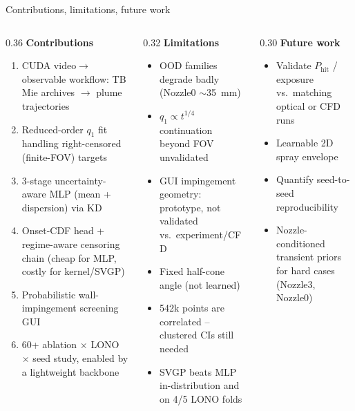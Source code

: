 \documentclass[aspectratio=169,11pt]{beamer}
\newcommand{\warn}[1]{\textcolor{warnRed}{#1}}
\begin{document}
\begin{frame}{Contributions, limitations, future work}
\footnotesize
\begin{columns}[T]
\begin{column}{0.36\linewidth}
\textbf{Contributions}
\begin{enumerate}\footnotesize
  \item CUDA video$\to$observable workflow: TB Mie archives $\to$ plume trajectories
  \item Reduced-order $q_1$ fit handling right-censored (finite-FOV) targets
  \item 3-stage uncertainty-aware MLP (mean + dispersion) via KD
  \item Onset-CDF head + regime-aware censoring chain (cheap for MLP, costly for kernel/SVGP)
  \item Probabilistic wall-impingement screening GUI
  \item 60+ ablation $\times$ LONO $\times$ seed study, enabled by a lightweight backbone
\end{enumerate}
\end{column}
\begin{column}{0.32\linewidth}
\textbf{\warn{Limitations}}
\begin{itemize}\footnotesize
  \item \warn{OOD families degrade badly} (Nozzle0 $\sim$\SI{35}{mm})
  \item $q_1\propto t^{1/4}$ continuation beyond FOV unvalidated
  \item GUI impingement geometry: prototype, not validated vs.\ experiment/CFD
  \item Fixed half-cone angle (not learned)
  \item 542k points are correlated -- clustered CIs still needed
  \item SVGP beats MLP in-distribution and on 4/5 LONO folds
\end{itemize}
\end{column}
\begin{column}{0.30\linewidth}
\textbf{Future work}
\begin{itemize}\footnotesize
  \item Validate $P_{\mathrm{hit}}$ / exposure vs.\ matching optical or CFD runs
  \item Learnable 2D spray envelope
  \item Quantify seed-to-seed reproducibility
  \item Nozzle-conditioned transient priors for hard cases (Nozzle3, Nozzle0)
\end{itemize}
\end{column}
\end{columns}
\end{frame}
\end{document}
